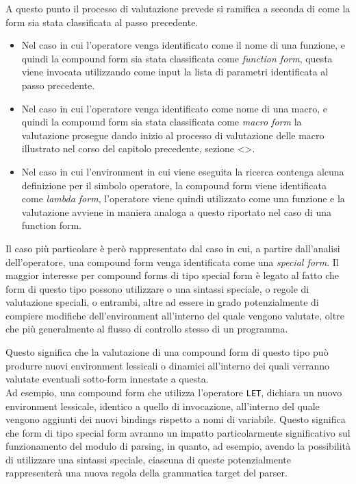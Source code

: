 A questo punto il processo di valutazione prevede si ramifica a seconda di come la form sia stata classificata al passo precedente.

\begin{itemize}

\item Nel caso in cui l’operatore venga identificato come il nome di una
funzione, e quindi la compound form sia stata classificata come
\textit{function form}, questa viene invocata utilizzando come input la lista
di parametri identificata al passo precedente.

\item Nel caso in cui l’operatore venga identificato come nome di una macro, e
quindi la compound form sia stata classificata come \textit{macro form} la
valutazione prosegue dando inizio al processo di valutazione delle macro
illustrato nel corso del capitolo precedente, sezione <>.

\item Nel caso in cui l’environment in cui viene eseguita la ricerca contenga
alcuna definizione per il simbolo operatore, la compound form viene
identificata come \textit{lambda form}, l’operatore viene quindi utilizzato
come una funzione e la valutazione avviene in maniera analoga a questo
riportato nel caso di una function form.

\end{itemize}

Il caso più particolare è però rappresentato dal caso in cui, a partire
dall’analisi dell’operatore, una compound form venga identificata come una
\textit{special form}. Il maggior interesse per compound forms di tipo special
form è legato al fatto che form di questo tipo possono utilizzare o una
sintassi speciale, o regole di valutazione speciali, o entrambi, altre ad
essere in grado potenzialmente di compiere modifiche dell’environment
all’interno del quale vengono valutate, oltre che più generalmente al flusso
di controllo stesso di un programma.

Questo significa che la valutazione di una compound form di questo tipo può
produrre nuovi environment lessicali o dinamici all’interno dei quali verranno
valutate eventuali sotto-form innestate a questa.\\

Ad esempio, una compound form che utilizza l’operatore \texttt{LET}, dichiara
un nuovo environment lessicale, identico a quello di invocazione, all’interno
del quale vengono aggiunti dei nuovi bindings rispetto a nomi di variabile.
Questo significa che form di tipo special form avranno un impatto
particolarmente significativo sul funzionamento del modulo di parsing, in
quanto, ad esempio, avendo la possibilità di utilizzare una sintassi speciale,
ciascuna di queste potenzialmente rappresenterà una nuova regola della
grammatica target del parser.\\

